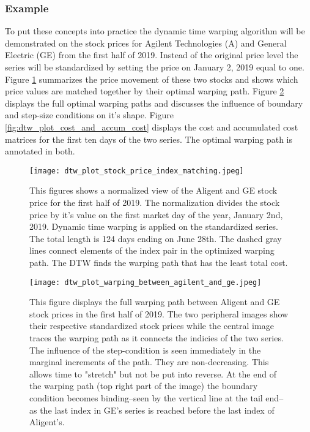 \documentclass[12pt]{article}
\begin{document}
\subsubsection{Example}

To put these concepts into practice the dynamic time warping algorithm will be demonstrated on the stock prices for Agilent Technologies (A) and General Electric (GE) from the first half of 2019. Instead of the original price level the series will be standardized by setting the price on January 2, 2019 equal to one. Figure \ref{fig:dtw_plot_stock_price_index_matching} summarizes the price movement of these two stocks and shows which price values are matched together by their optimal warping path. Figure \ref{fig:dtw_plot_warping_between_agilent_and_ge} displays the full optimal warping paths and discusses the influence of boundary and step-size conditions on it's shape. Figure \ref{fig:dtw_plot_cost_and_accum_cost} displays the cost and accumulated cost matrices for the first ten days of the two series. The optimal warping path is annotated in both.

\begin{figure}
    \centering
    \texttt{[image: dtw\_plot\_stock\_price\_index\_matching.jpeg]}
    \caption{This figures shows a normalized view of the Aligent and GE stock price for the first half of 2019. The normalization divides the stock price by it's value on the first market day of the year, January 2nd, 2019. Dynamic time warping is applied on the standardized series. The total length is 124 days ending on June 28th. The dashed gray lines connect elements of the index pair in the optimized warping path. The DTW finds the warping path that has the least total cost.}
    \label{fig:dtw_plot_stock_price_index_matching}
\end{figure}

\begin{figure}
    \centering
    \texttt{[image: dtw\_plot\_warping\_between\_agilent\_and\_ge.jpeg]}
    \caption{This figure displays the full warping path between Aligent and GE stock prices in the first half of 2019. The two peripheral images show their respective standardized stock prices while the central image traces the warping path as it connects the indicies of the two series. The influence of the step-condition is seen immediately in the marginal increments of the path. They are non-decreasing. This allows time to "stretch" but not be put into reverse. At the end of the warping path (top right part of the image) the boundary condition becomes binding--seen by the vertical line at the tail end--as the last index in GE's series is reached before the last index of Aligent's.}
    \label{fig:dtw_plot_warping_between_agilent_and_ge}
\end{figure}
\end{document}
